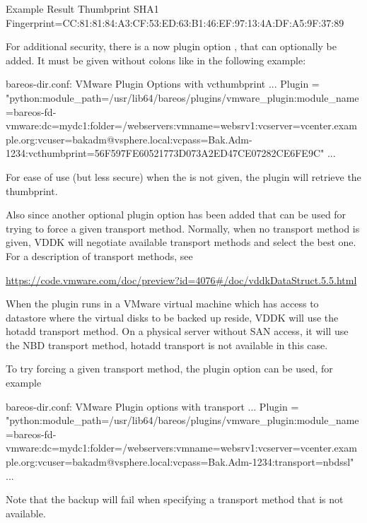 \begin{commands}{Example Result Thumbprint}
SHA1 Fingerprint=CC:81:81:84:A3:CF:53:ED:63:B1:46:EF:97:13:4A:DF:A5:9F:37:89
\end{commands}

For additional security, there is a now plugin option , that can optionally
be added. It must be given without colons like in the following example:

\begin{bconfig}{bareos-dir.conf: VMware Plugin Options with vcthumbprint}
    ...
    Plugin = "python:module_path=/usr/lib64/bareos/plugins/vmware_plugin:module_name=bareos-fd-vmware:dc=mydc1:folder=/webservers:vmname=websrv1:vcserver=vcenter.example.org:vcuser=bakadm@vsphere.local:vcpass=Bak.Adm-1234:vcthumbprint=56F597FE60521773D073A2ED47CE07282CE6FE9C"
    ...
\end{bconfig}

For ease of use (but less secure) when the  is not given, the plugin
will retrieve the thumbprint.

Also since  another optional plugin option has
been added that can be used for trying to force a given transport method. Normally, when
no transport method is given, VDDK will negotiate available transport methods and select
the best one. For a description of transport methods, see

\url{https://code.vmware.com/doc/preview?id=4076#/doc/vddkDataStruct.5.5.html}

When the plugin runs in a VMware virtual machine which has access to datastore where the
virtual disks to be backed up reside, VDDK will use the hotadd transport method.
On a physical server without SAN access, it will use the NBD transport method, hotadd
transport is not available in this case.

To try forcing a given transport method, the plugin option  can
be used, for example

\begin{bconfig}{bareos-dir.conf: VMware Plugin options with transport}
    ...
    Plugin = "python:module_path=/usr/lib64/bareos/plugins/vmware_plugin:module_name=bareos-fd-vmware:dc=mydc1:folder=/webservers:vmname=websrv1:vcserver=vcenter.example.org:vcuser=bakadm@vsphere.local:vcpass=Bak.Adm-1234:transport=nbdssl"
    ...
\end{bconfig}

Note that the backup will fail when specifying a transport method that is not available.

